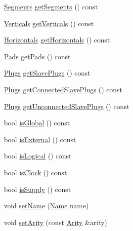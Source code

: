 \begin{DoxyCompactItemize}
\item 
\hyperlink{namespaceHurricane_a30748fa53a81cb597d4a13d651238716}{Segments} \hyperlink{classHurricane_1_1Net_a7fedf8227eccd3cf6f2f5e4ee26ed953}{get\-Segments} () const 
\item 
\hyperlink{namespaceHurricane_a146e2d3d34b4035aff422f12e85345b9}{Verticals} \hyperlink{classHurricane_1_1Net_a82cf6b0f2f910d4777554991503d603c}{get\-Verticals} () const 
\item 
\hyperlink{namespaceHurricane_a721e644c7d97f2f66049ab062140b855}{Horizontals} \hyperlink{classHurricane_1_1Net_a3fda4366e7a0d27b189be378b2542e00}{get\-Horizontals} () const 
\item 
\hyperlink{namespaceHurricane_abd1f433c44d8b515e1b8a8810aea1610}{Pads} \hyperlink{classHurricane_1_1Net_a8dda159ada778bd2b027147282fd94de}{get\-Pads} () const 
\item 
\hyperlink{namespaceHurricane_ac8335d2057483ee7a935c15a9460c64f}{Plugs} \hyperlink{classHurricane_1_1Net_a1bf617be669b3fcf4a16ee3ceaaafdf9}{get\-Slave\-Plugs} () const 
\item 
\hyperlink{namespaceHurricane_ac8335d2057483ee7a935c15a9460c64f}{Plugs} \hyperlink{classHurricane_1_1Net_a910001060974d2ed49d3de02e1ec8b18}{get\-Connected\-Slave\-Plugs} () const 
\item 
\hyperlink{namespaceHurricane_ac8335d2057483ee7a935c15a9460c64f}{Plugs} \hyperlink{classHurricane_1_1Net_a8a5f01aefcae77c7f696b71e4c677048}{get\-Unconnected\-Slave\-Plugs} () const 
\item 
bool \hyperlink{classHurricane_1_1Net_a2d3d69e66f8f02069ba05949c3fd14d7}{is\-Global} () const 
\item 
bool \hyperlink{classHurricane_1_1Net_a50ff53a7db9ab8653dd122a6d2b90de4}{is\-External} () const 
\item 
bool \hyperlink{classHurricane_1_1Net_aa131009d83d948da89b14c8045c1d894}{is\-Logical} () const 
\item 
bool \hyperlink{classHurricane_1_1Net_aa01493bdfb5e48110ca45c5fc59de862}{is\-Clock} () const 
\item 
bool \hyperlink{classHurricane_1_1Net_a02733d2b21037f845ce972ecb62d205a}{is\-Supply} () const 
\item 
void \hyperlink{classHurricane_1_1Net_a1a39702b9f4d26ba29ad0dafcdddf840}{set\-Name} (\hyperlink{classHurricane_1_1Name}{Name} name)
\item 
void \hyperlink{classHurricane_1_1Net_af5dfdca4401902ee7e1e46a1a486da38}{set\-Arity} (const \hyperlink{classHurricane_1_1Net_a3a242d929e0c733f90f3f69be8cc427b}{Arity} \&arity)

\end{DoxyCompactItemize}
